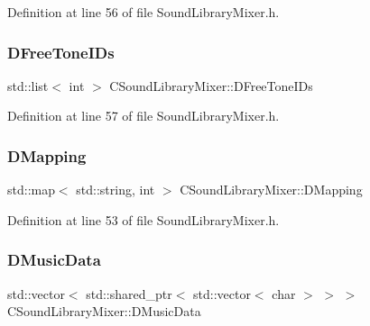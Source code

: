 Definition at line 56 of file Sound\+Library\+Mixer.\+h.

\hypertarget{classCSoundLibraryMixer_a2d1389368651db10fd6fd8b3cd08c164}{}\label{classCSoundLibraryMixer_a2d1389368651db10fd6fd8b3cd08c164} 
\subsubsection{\texorpdfstring{D\+Free\+Tone\+I\+Ds}{DFreeToneIDs}}
{\footnotesize\ttfamily std\+::list$<$ int $>$ C\+Sound\+Library\+Mixer\+::\+D\+Free\+Tone\+I\+Ds\hspace{0.3cm}{\ttfamily [protected]}}



Definition at line 57 of file Sound\+Library\+Mixer.\+h.

\hypertarget{classCSoundLibraryMixer_a8f193156cafc61b64f04ed88dcabd27d}{}\label{classCSoundLibraryMixer_a8f193156cafc61b64f04ed88dcabd27d} 
\subsubsection{\texorpdfstring{D\+Mapping}{DMapping}}
{\footnotesize\ttfamily std\+::map$<$ std\+::string, int $>$ C\+Sound\+Library\+Mixer\+::\+D\+Mapping\hspace{0.3cm}{\ttfamily [protected]}}



Definition at line 53 of file Sound\+Library\+Mixer.\+h.

\hypertarget{classCSoundLibraryMixer_a494744db8ea800dd1443418711183846}{}\label{classCSoundLibraryMixer_a494744db8ea800dd1443418711183846} 
\subsubsection{\texorpdfstring{D\+Music\+Data}{DMusicData}}
{\footnotesize\ttfamily std\+::vector$<$ std\+::shared\+\_\+ptr$<$ std\+::vector$<$ char $>$ $>$ $>$ C\+Sound\+Library\+Mixer\+::\+D\+Music\+Data\hspace{0.3cm}{\ttfamily [protected]}}



